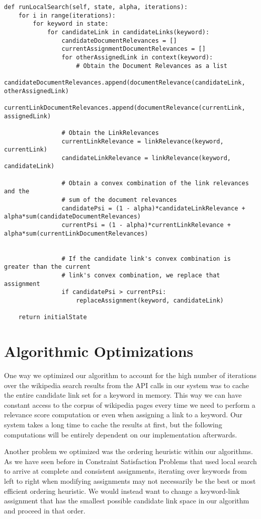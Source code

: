 \documentclass[twoside,11pt]{article}
\begin{document}
\begin{lstlisting}
def runLocalSearch(self, state, alpha, iterations):
    for i in range(iterations):
        for keyword in state:
            for candidateLink in candidateLinks(keyword):
                candidateDocumentRelevances = []
                currentAssignmentDocumentRelevances = []
                for otherAssignedLink in context(keyword):
                    # Obtain the Document Relevances as a list
                    candidateDocumentRelevances.append(documentRelevance(candidateLink, otherAssignedLink)
                    currentLinkDocumentRelevances.append(documentRelevance(currentLink, assignedLink)

                # Obtain the LinkRelevances
                currentLinkRelevance = linkRelevance(keyword, currentLink)
                candidateLinkRelevance = linkRelevance(keyword, candidateLink)

                # Obtain a convex combination of the link relevances and the
                # sum of the document relevances
                candidatePsi = (1 - alpha)*candidateLinkRelevance + alpha*sum(candidateDocumentRelevances)
                currentPsi = (1 - alpha)*currentLinkRelevance + alpha*sum(currentLinkDocumentRelevances)


                # If the candidate link's convex combination is greater than the current
                # link's convex combination, we replace that assignment
                if candidatePsi > currentPsi:
                    replaceAssignment(keyword, candidateLink)

    return initialState
\end{lstlisting}

\section{Algorithmic Optimizations}

One way we optimized our algorithm to account for the high number of iterations over the wikipedia search results from the API calls in our system was to cache the entire candidate link set for a keyword in memory. This way we can have constant access to the corpus of wikipedia pages every time we need to perform a relevance score computation or even when assigning a link to a keyword. Our system takes a long time to cache the results at first, but the following computations will be entirely dependent on our implementation afterwards.

Another problem we optimized was the ordering heuristic within our algorithms. As we have seen before in Constraint Satisfaction Problems that used local search to arrive at complete and consistent assignments, iterating over keywords from left to right when modifying assignments may not necessarily be the best or most efficient ordering heuristic. We would instead want to change a keyword-link assignment that has the smallest possible candidate link space in our algorithm and proceed in that order.
\end{document}
